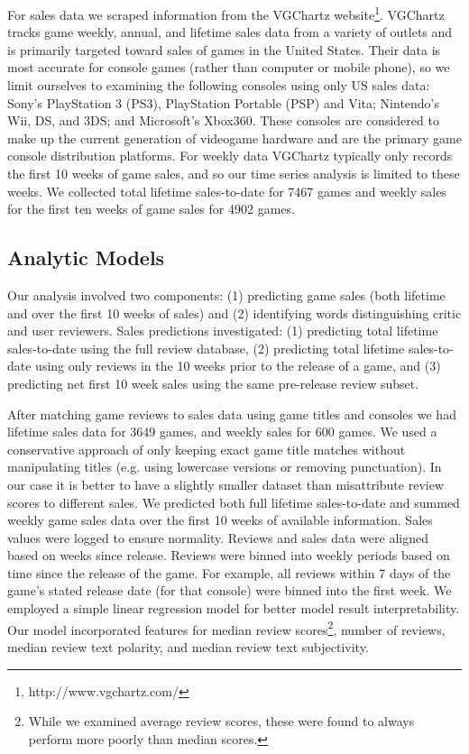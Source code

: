 \documentclass[letterpaper]{article}
\begin{document}
For sales data we scraped information from the VGChartz website\footnote{http://www.vgchartz.com/}. VGChartz tracks game weekly, annual, and lifetime sales data from a variety of outlets and is primarily targeted toward sales of games in the United States. Their data is most accurate for console games (rather than computer or mobile phone), so we limit ourselves to examining the following consoles using only US sales data: Sony's PlayStation 3 (PS3), PlayStation Portable (PSP) and Vita; Nintendo's Wii, DS, and 3DS; and Microsoft's Xbox360. These consoles are considered to make up the current generation of videogame hardware and are the primary game console distribution platforms. For weekly data VGChartz typically only records the first 10 weeks of game sales, and so our time series analysis is limited to these weeks. We collected total lifetime sales-to-date for 7467 games and weekly sales for the first ten weeks of game sales for 4902 games.

\subsection{Analytic Models}
Our analysis involved two components: (1) predicting game sales (both lifetime and over the first 10 weeks of sales) and (2) identifying words distinguishing critic and user reviewers. Sales predictions investigated: (1) predicting total lifetime sales-to-date using the full review database, (2) predicting total lifetime sales-to-date using only reviews in the 10 weeks prior to the release of a game, and (3) predicting net first 10 week sales using the same pre-release review subset.

After matching game reviews to sales data using game titles and consoles we had lifetime sales data for 3649 games, and weekly sales for 600 games. We used a conservative approach of only keeping exact game title matches without manipulating titles (e.g. using lowercase versions or removing punctuation). In our case it is better to have a slightly smaller dataset than misattribute review scores to different sales. We predicted both full lifetime sales-to-date and summed weekly game sales data over the first 10 weeks of available information. Sales values were logged to ensure normality. Reviews and sales data were aligned based on weeks since release. Reviews were binned into weekly periods based on time since the release of the game. For example, all reviews within 7 days of the game's stated release date (for that console) were binned into the first week. We employed a simple linear regression model for better model result interpretability. Our model incorporated features for median review scores\footnote{While we examined average review scores, these were found to always perform more poorly than median scores.}, number of reviews, median review text polarity, and median review text subjectivity.
\end{document}

